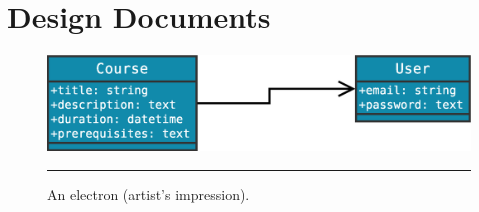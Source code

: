 
\chapter{Design Documents}
\label{AppendixC}

\begin{figure}[htbp]
\centering
\includegraphics{./Figures/discite.eps}
\rule{35em}{0.5pt}
\caption[An Electron]{An electron (artist’s impression).}
\label{fig:Electron}
\end{figure}
